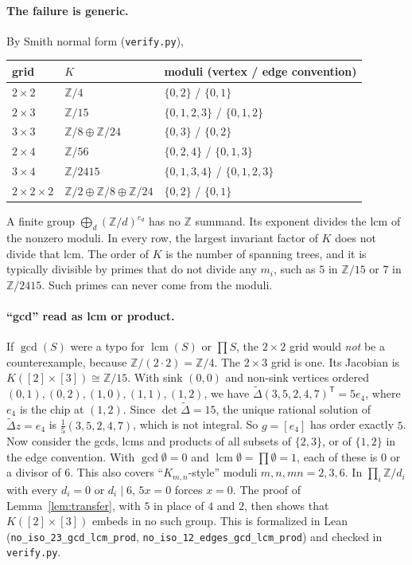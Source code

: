 \documentclass[11pt]{article}
\theoremstyle{definition}
\theoremstyle{remark}
\newcommand{\Z}{\mathbb{Z}}
\begin{document}
\paragraph{The failure is generic.} By Smith normal form (\texttt{verify.py}),
\begin{center}
\begin{tabular}{lll}
grid & $K$ & moduli (vertex / edge convention)\\\hline
$2\times2$ & $\Z/4$ & $\{0,2\}$ / $\{0,1\}$\\
$2\times3$ & $\Z/15$ & $\{0,1,2,3\}$ / $\{0,1,2\}$\\
$3\times3$ & $\Z/8\oplus\Z/24$ & $\{0,3\}$ / $\{0,2\}$\\
$2\times4$ & $\Z/56$ & $\{0,2,4\}$ / $\{0,1,3\}$\\
$3\times4$ & $\Z/2415$ & $\{0,1,3,4\}$ / $\{0,1,2,3\}$\\
$2\times2\times2$ & $\Z/2\oplus\Z/8\oplus\Z/24$ & $\{0,2\}$ / $\{0,1\}$
\end{tabular}
\end{center}
A finite group $\bigoplus_d(\Z/d)^{e_d}$ has no $\Z$ summand. Its exponent
divides the lcm of the nonzero moduli. In every row, the largest invariant factor of $K$
does not divide that lcm. The order of $K$ is the number of spanning trees,
and it is typically divisible by primes that do not divide any $m_i$, such as $5$
in $\Z/15$ or $7$ in $\Z/2415$. Such primes can never come from the moduli.

\paragraph{``gcd'' read as lcm or product.} If $\gcd(S)$ were a typo for
$\operatorname{lcm}(S)$ or $\prod S$, the $2\times2$ grid would \emph{not} be a
counterexample, because $\Z/(2\cdot2)=\Z/4$. The $2\times3$ grid is one. Its
Jacobian is $K([2]\times[3])\cong\Z/15$. With sink $(0,0)$ and non-sink
vertices ordered $(0,1),(0,2),(1,0),(1,1),(1,2)$, we have
$\tilde\Delta(3,5,2,4,7)^{\mathsf T}=5e_4$, where $e_4$ is the chip at $(1,2)$.
Since $\det\tilde\Delta=15$, the unique rational solution of $\tilde\Delta z=e_4$ is
$\frac15(3,5,2,4,7)$, which is not integral. So $g=[e_4]$ has order exactly $5$. Now consider the
gcds, lcms and products of all subsets of $\{2,3\}$, or of $\{1,2\}$ in the
edge convention. With $\gcd\emptyset=0$ and $\operatorname{lcm}\emptyset=\prod\emptyset=1$,
each of these is $0$ or a divisor of $6$. This also covers ``$K_{m,n}$-style'' moduli
$m,n,mn=2,3,6$. In $\prod_i\Z/d_i$ with every $d_i=0$ or $d_i\mid6$, $5x=0$
forces $x=0$. The proof of Lemma~\ref{lem:transfer}, with $5$ in place of
$4$ and $2$, then shows that $K([2]\times[3])$ embeds in no such group. This is
formalized in Lean (\texttt{no\_iso\_23\_gcd\_lcm\_prod},
\texttt{no\_iso\_12\_edges\_gcd\_lcm\_prod}) and checked in \texttt{verify.py}.
\end{document}
